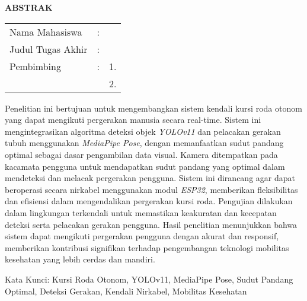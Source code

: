 \begin{center}
  \large\textbf{ABSTRAK}
\end{center}


\vspace{2ex}

\begingroup
\setlength{\tabcolsep}{0pt}

\noindent
\begin{tabularx}{\textwidth}{l >{\centering}m{2em} X}
  Nama Mahasiswa    & : & \name{}         \\

  Judul Tugas Akhir & : & \tatitle{}      \\

  Pembimbing        & : & 1. \advisor{}   \\
                    &   & 2. \coadvisor{} \\
\end{tabularx}
\endgroup

Penelitian ini bertujuan untuk mengembangkan sistem kendali kursi roda otonom yang dapat mengikuti pergerakan manusia secara real-time. Sistem ini mengintegrasikan algoritma deteksi objek \emph{YOLOv11} dan pelacakan gerakan tubuh menggunakan \emph{MediaPipe Pose}, dengan memanfaatkan sudut pandang optimal sebagai dasar pengambilan data visual. Kamera ditempatkan pada kacamata pengguna untuk mendapatkan sudut pandang yang optimal dalam mendeteksi dan melacak pergerakan pengguna. Sistem ini dirancang agar dapat beroperasi secara nirkabel menggunakan modul \emph{ESP32}, memberikan fleksibilitas dan efisiensi dalam mengendalikan pergerakan kursi roda. Pengujian dilakukan dalam lingkungan terkendali untuk memastikan keakuratan dan kecepatan deteksi serta pelacakan gerakan pengguna. Hasil penelitian menunjukkan bahwa sistem dapat mengikuti pergerakan pengguna dengan akurat dan responsif, memberikan kontribusi signifikan terhadap pengembangan teknologi mobilitas kesehatan yang lebih cerdas dan mandiri.

Kata Kunci: Kursi Roda Otonom, YOLOv11, MediaPipe Pose, Sudut Pandang Optimal, Deteksi Gerakan, Kendali Nirkabel, Mobilitas Kesehatan
